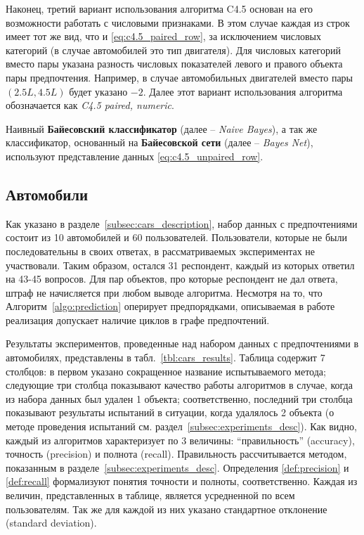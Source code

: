 	Наконец, третий вариант использования алгоритма C4.5 основан на его возможности работать с числовыми признаками. В этом случае каждая из строк имеет тот же вид, что и \eqref{eq:c4.5_paired_row}, за исключением числовых категорий (в случае автомобилей это тип двигателя). Для числовых категорий вместо пары указана разность числовых показателей левого и правого объекта пары предпочтения. Например, в случае автомобильных двигателей вместо пары $(2.5L, 4.5L)$ будет указано $-2$. Далее этот вариант использования алгоритма обозначается как \emph{C4.5 paired, numeric}. 
	
	Наивный \textbf{Байесовский классификатор} (далее – \emph{Naive Bayes}), а так же классификатор, основанный на \textbf{Байесовской сети} (далее – \emph{Bayes Net}), используют представление данных \eqref{eq:c4.5_unpaired_row}. 

	
	\subsection{Автомобили}
	\label{subsec:exp_cars}
		Как указано в разделе~\ref{subsec:cars_description}, набор данных с предпочтениями состоит из 10 автомобилей и 60 пользователей. Пользователи, которые не были последовательны в своих ответах, в рассматриваемых экспериментах не участвовали. Таким образом, остался 31 респондент, каждый из которых ответил на 43-45 вопросов. Для пар объектов, про которые респондент не дал ответа, штраф не начисляется при любом выводе алгоритма. Несмотря на то, что Алгоритм~\ref{algo:prediction} оперирует предпорядками, описываемая в работе реализация допускает наличие циклов в графе предпочтений.
	
		Результаты экспериментов, проведенные над набором данных с предпочтениями в автомобилях, представлены в табл.~\ref{tbl:cars_results}. Таблица содержит 7 столбцов: в первом указано сокращенное название испытываемого метода; следующие три столбца показывают качество работы алгоритмов в случае, когда из набора данных был удален 1 объекта; соответственно, последний три столбца показывают результаты испытаний в ситуации, когда удалялось 2 объекта (о методе проведения испытаний см. раздел~\ref{subsec:experiments_desc}). Как видно, каждый из алгоритмов характеризует по 3 величины: ``правильность'' (accuracy), точность (precision) и полнота (recall). Правильность рассчитывается методом, показанным в разделе~\ref{subsec:experiments_desc}. Определения \ref{def:precision} и \ref{def:recall} формализуют понятия точности и полноты, соответственно. Каждая из величин, представленных в таблице, является усредненной по всем пользователям. Так же для каждой из них указано стандартное отклонение (standard deviation).

